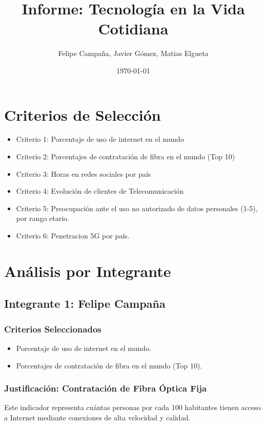 \documentclass[12pt, a4paper]{article}
\title{Informe: Tecnología en la Vida Cotidiana}
\author{Felipe Campaña, Javier Gómez, Matias Elgueta}
\date{\today\\[2cm]}
\begin{document}
\maketitle

\section*{Criterios de Selección}
\begin{itemize}
    \item Criterio 1: Porcentaje de uso de internet en el mundo
    \item Criterio 2: Porcentajes de contratación de fibra en el mundo (Top 10)
    \item Criterio 3: Horas en redes sociales por país
    \item Criterio 4: Evolución de clientes de Telecomunicación
    \item Criterio 5: Preocupación ante el uso no autorizado de datos personales (1-5), por rango etario.
    \item Criterio 6: Penetracion 5G por país.
\end{itemize}



\section*{Análisis por Integrante}

\subsection*{Integrante 1: Felipe Campaña}

\subsubsection*{Criterios Seleccionados}
\begin{itemize}
    \item Porcentaje de uso de internet en el mundo.
    \item Porcentajes de contratación de fibra en el mundo (Top 10).
\end{itemize}

\subsubsection*{Justificación: Contratación de Fibra Óptica Fija}
Este indicador representa cuántas personas por cada 100 habitantes tienen acceso a Internet mediante conexiones de alta velocidad y calidad. 
\end{document}
